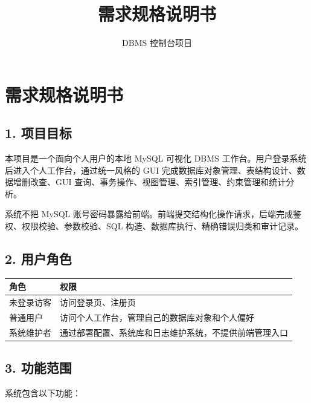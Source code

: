 \documentclass[
  a4paper,
  UTF8]{ctexart}
\title{需求规格说明书}
\author{DBMS 控制台项目}
\date{}
\begin{document}
\maketitle

\renewcommand*\contentsname{目录}
{
\hypersetup{linkcolor=}
\setcounter{tocdepth}{3}
\tableofcontents
}
\hypertarget{ux9700ux6c42ux89c4ux683cux8bf4ux660eux4e66}{%
\section{需求规格说明书}\label{ux9700ux6c42ux89c4ux683cux8bf4ux660eux4e66}}

\hypertarget{ux9879ux76eeux76eeux6807}{%
\subsection{1. 项目目标}\label{ux9879ux76eeux76eeux6807}}

本项目是一个面向个人用户的本地 MySQL 可视化 DBMS
工作台。用户登录系统后进入个人工作台，通过统一风格的 GUI
完成数据库对象管理、表结构设计、数据增删改查、GUI
查询、事务操作、视图管理、索引管理、约束管理和统计分析。

系统不把 MySQL
账号密码暴露给前端。前端提交结构化操作请求，后端完成鉴权、权限校验、参数校验、SQL
构造、数据库执行、精确错误归类和审计记录。

\hypertarget{ux7528ux6237ux89d2ux8272}{%
\subsection{2. 用户角色}\label{ux7528ux6237ux89d2ux8272}}

\begin{longtable}[]{@{}ll@{}}
\toprule
角色 & 权限 \\
\midrule
\endhead
未登录访客 & 访问登录页、注册页 \\
普通用户 & 访问个人工作台，管理自己的数据库对象和个人偏好 \\
系统维护者 & 通过部署配置、系统库和日志维护系统，不提供前端管理入口 \\
\bottomrule
\end{longtable}

\hypertarget{ux529fux80fdux8303ux56f4}{%
\subsection{3. 功能范围}\label{ux529fux80fdux8303ux56f4}}

系统包含以下功能：
\end{document}
